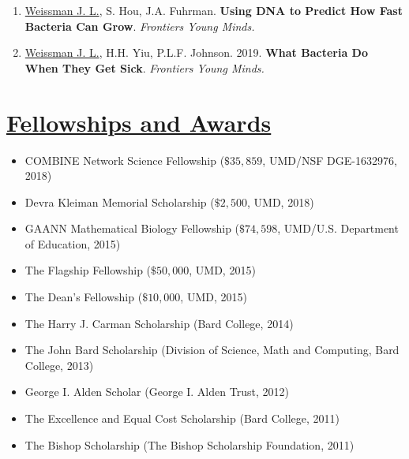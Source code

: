 \documentclass[]{res}
\begin{document}
\begin{resume}
\begin{enumerate}[leftmargin=*]
\item \underline{Weissman J. L.}, S. Hou, J.A. Fuhrman. {\bf Using DNA to Predict How Fast Bacteria Can Grow}. \emph{Frontiers Young Minds.}

\item \underline{Weissman J. L.}, H.H. Yiu, P.L.F. Johnson. 2019. {\bf What Bacteria Do When They Get Sick}. \emph{Frontiers Young Minds.}


  \end{enumerate} 
  
   \section{\underline{Fellowships and Awards}} %
\begin{itemize}[leftmargin=*]
\item[] COMBINE Network Science Fellowship ($\$35,859$, UMD/NSF DGE-1632976, 2018)
\item[] Devra Kleiman Memorial Scholarship ($\$2,500$, UMD, 2018)
\item[] GAANN Mathematical Biology Fellowship ($\$74,598$, UMD/U.S. Department of Education, 2015)
\item[] The Flagship Fellowship ($\$50,000$, UMD, 2015)
\item[] The Dean's Fellowship ($\$10,000$, UMD, 2015)
\item[] The Harry J. Carman Scholarship (Bard College, 2014)
\item[] The John Bard Scholarship (Division of Science, Math and Computing, Bard College, 2013)
\item[] George I. Alden Scholar (George I. Alden Trust, 2012)%
\item[] The Excellence and Equal Cost Scholarship (Bard College, 2011) 
\item[] The Bishop Scholarship (The Bishop Scholarship Foundation, 2011)
\end{itemize}
  

\end{resume}
\end{document}
